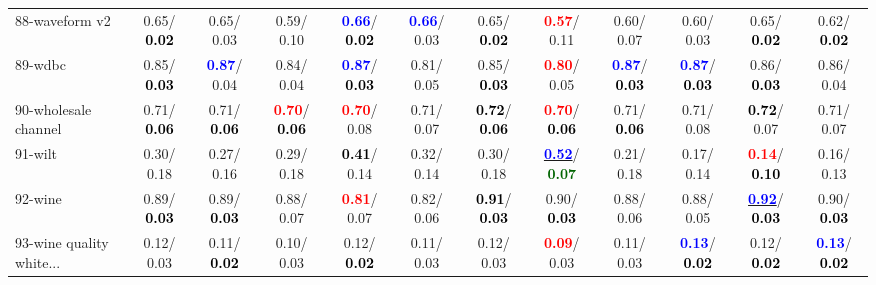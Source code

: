 \begin{table}[h]
\begin{center}
{\begin{tabular}{lc|c|c|c|c|c|c|c|c|c|c}
88-waveform v2 &   0.65/\textcolor{black}{\textbf{  0.02}} &   0.65/  0.03 &   0.59/  0.10 & \textcolor{blue}{\textbf{  0.66}}/\textcolor{black}{\textbf{  0.02}} & \textcolor{blue}{\textbf{  0.66}}/  0.03 &   0.65/\textcolor{black}{\textbf{  0.02}} & \textcolor{red}{\textbf{  0.57}}/  0.11 &   0.60/  0.07 &   0.60/  0.03 &   0.65/\textcolor{black}{\textbf{  0.02}} &   0.62/\textcolor{black}{\textbf{  0.02}} \\
89-wdbc &   0.85/\textcolor{black}{\textbf{  0.03}} & \textcolor{blue}{\textbf{  0.87}}/  0.04 &   0.84/  0.04 & \textcolor{blue}{\textbf{  0.87}}/\textcolor{black}{\textbf{  0.03}} &   0.81/  0.05 &   0.85/\textcolor{black}{\textbf{  0.03}} & \textcolor{red}{\textbf{  0.80}}/  0.05 & \textcolor{blue}{\textbf{  0.87}}/\textcolor{black}{\textbf{  0.03}} & \textcolor{blue}{\textbf{  0.87}}/\textcolor{black}{\textbf{  0.03}} &   0.86/\textcolor{black}{\textbf{  0.03}} &   0.86/  0.04 \\
90-wholesale channel &   0.71/\textcolor{black}{\textbf{  0.06}} &   0.71/\textcolor{black}{\textbf{  0.06}} & \textcolor{red}{\textbf{  0.70}}/\textcolor{black}{\textbf{  0.06}} & \textcolor{red}{\textbf{  0.70}}/  0.08 &   0.71/  0.07 & \textcolor{black}{\textbf{  0.72}}/\textcolor{black}{\textbf{  0.06}} & \textcolor{red}{\textbf{  0.70}}/\textcolor{black}{\textbf{  0.06}} &   0.71/\textcolor{black}{\textbf{  0.06}} &   0.71/  0.08 & \textcolor{black}{\textbf{  0.72}}/  0.07 &   0.71/  0.07 \\
91-wilt &   0.30/  0.18 &   0.27/  0.16 &   0.29/  0.18 & \textcolor{black}{\textbf{  0.41}}/  0.14 &   0.32/  0.14 &   0.30/  0.18 & \underline{\textcolor{blue}{\textbf{  0.52}}}/\textcolor{darkgreen}{\textbf{  0.07}} &   0.21/  0.18 &   0.17/  0.14 & \textcolor{red}{\textbf{  0.14}}/\textcolor{black}{\textbf{  0.10}} &   0.16/  0.13 \\
92-wine &   0.89/\textcolor{black}{\textbf{  0.03}} &   0.89/\textcolor{black}{\textbf{  0.03}} &   0.88/  0.07 & \textcolor{red}{\textbf{  0.81}}/  0.07 &   0.82/  0.06 & \textcolor{black}{\textbf{  0.91}}/\textcolor{black}{\textbf{  0.03}} &   0.90/\textcolor{black}{\textbf{  0.03}} &   0.88/  0.06 &   0.88/  0.05 & \underline{\textcolor{blue}{\textbf{  0.92}}}/\textcolor{black}{\textbf{  0.03}} &   0.90/\textcolor{black}{\textbf{  0.03}} \\ \hline
93-wine quality white... &   0.12/  0.03 &   0.11/\textcolor{black}{\textbf{  0.02}} &   0.10/  0.03 &   0.12/\textcolor{black}{\textbf{  0.02}} &   0.11/  0.03 &   0.12/  0.03 & \textcolor{red}{\textbf{  0.09}}/  0.03 &   0.11/  0.03 & \textcolor{blue}{\textbf{  0.13}}/\textcolor{black}{\textbf{  0.02}} &   0.12/\textcolor{black}{\textbf{  0.02}} & \textcolor{blue}{\textbf{  0.13}}/\textcolor{black}{\textbf{  0.02}} \\

\end{tabular}}
\end{center}
\end{table}
